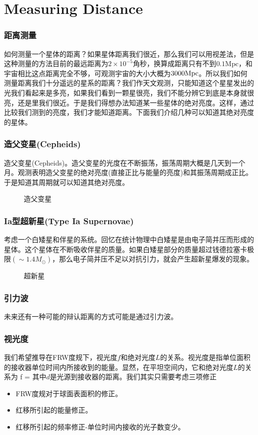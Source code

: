 \documentclass[11pt]{beamer}
\begin{document}
\section{Measuring Distance}
\begin{frame}\frametitle{距离测量}
如何测量一个星体的距离？如果星体距离我们很近，那么我们可以用视差法，但是这种测量的方法目前的最远距离为$2\times 10^{-5}$角秒，换算成距离只有不到$0.1 \mathrm{Mpc}$，和宇宙相比这点距离完全不够，可观测宇宙的大小大概为$3000{\mathrm{Mpc}}$。所以我们如何测量距离我们十分遥远的星系的距离？我们作天文观测，只能知道这个星星发出的光我们看起来是多亮，如果我们看到一颗星很亮，我们不能分辨它到底是本身就很亮，还是里我们很近。于是我们得想办法知道某一些星体的绝对亮度。这样，通过比较我们测到的亮度，我们才能知道距离。下面我们介绍几种可以知道其绝对亮度的星体。
\end{frame}
\begin{frame}\frametitle{造父变星(Cepheids)}
造父变星(Cepheids)。造父变星的光度在不断振荡，振荡周期大概是几天到一个月。观测表明造父变星的绝对亮度(直接正比与能量的亮度)和其振荡周期成正比。于是知道其周期就可以知道其绝对亮度。
\begin{figure}[!t]
\centering
{}
\caption{造父变星}
\label{cepheids}
\end{figure}
\end{frame}
\begin{frame}\frametitle{Ia型超新星(Type Ia Supernovae)}
考虑一个白矮星和伴星的系统。回忆在统计物理中白矮星是由电子简并压而形成的星体。这个星体在不断吸收伴星的质量。如果白矮星部分的质量超过钱德拉塞卡极限$(\sim 1.4 M_{\odot})$，那么电子简并压不足以对抗引力，就会产生超新星爆发的现象。
\begin{figure}[!t]
\centering
\subfigure[超新星爆发的遗迹] {\texttt{[image: G299]}}
\caption{超新星}
\label{cepheids}
\end{figure}
\end{frame}
\begin{frame}\frametitle{引力波}
未来还有一种可能的辩认距离的方式可能是通过引力波。
\end{frame}
\begin{frame}\frametitle{视光度}
我们希望推导在FRW度规下，视光度$f$和绝对光度$L$的关系。视光度是指单位面积的接收器单位时间内所接收到的能量。显然，在平坦空间内，它和绝对光度$L$的关系为
\be 
f = 
\ee 
其中$d$是光源到接收器的距离。我们其实只需要考虑三项修正
\begin{itemize}
	\item FRW度规对于球面表面积的修正。
	\item 红移所引起的能量修正。
	\item 红移所引起的频率修正-单位时间内接收的光子数变少。
\end{itemize}

\end{frame}
\end{document}
